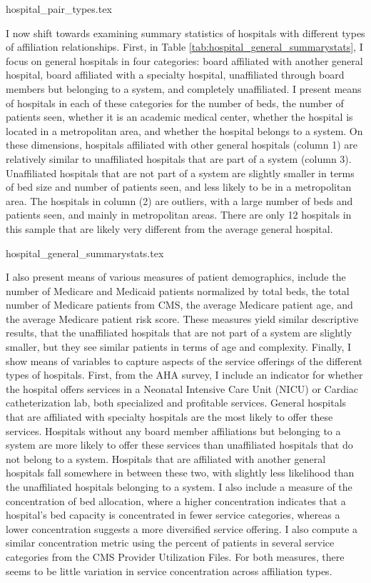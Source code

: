 \documentclass[12pt]{article}
\begin{document}
    {hospital_pair_types.tex}

    I now shift towards examining summary statistics of hospitals with different types of affiliation relationships. First, in Table \ref{tab:hospital_general_summarystats}, I focus on general hospitals in four categories: board affiliated with another general hospital, board affiliated with a specialty hospital, unaffiliated through board members but belonging to a system, and completely unaffiliated. I present means of hospitals in each of these categories for the number of beds, the number of patients seen, whether it is an academic medical center, whether the hospital is located in a metropolitan area, and whether the hospital belongs to a system. On these dimensions, hospitals affiliated with other general hospitals (column 1) are relatively similar to unaffiliated hospitals that are part of a system (column 3). Unaffiliated hospitals that are not part of a system are slightly smaller in terms of bed size and number of patients seen, and less likely to be in a metropolitan area. The hospitals in column (2) are outliers, with a large number of beds and patients seen, and mainly in metropolitan areas. There are only 12 hospitals in this sample that are likely very different from the average general hospital. 

    {hospital_general_summarystats.tex}

    I also present means of various measures of patient demographics, include the number of Medicare and Medicaid patients normalized by total beds, the total number of Medicare patients from CMS, the average Medicare patient age, and the average Medicare patient risk score. These measures yield similar descriptive results, that the unaffiliated hospitals that are not part of a system are slightly smaller, but they see similar patients in terms of age and complexity. Finally, I show means of variables to capture aspects of the service offerings of the different types of hospitals. First, from the AHA survey, I include an indicator for whether the hospital offers services in a Neonatal Intensive Care Unit (NICU) or Cardiac catheterization lab, both specialized and profitable services. General hospitals that are affiliated with specialty hospitals are the most likely to offer these services. Hospitals without any board member affiliations but belonging to a system are more likely to offer these services than unaffiliated hospitals that do not belong to a system. Hospitals that are affiliated with another general hospitals fall somewhere in between these two, with slightly less likelihood than the unaffiliated hospitals belonging to a system. I also include a measure of the concentration of bed allocation, where a higher concentration indicates that a hospital's bed capacity is concentrated in fewer service categories, whereas a lower concentration suggests a more diversified service offering. I also compute a similar concentration metric using the percent of patients in several service categories from the CMS Provider Utilization Files. For both measures, there seems to be little variation in service concentration across affiliation types.
\end{document}
